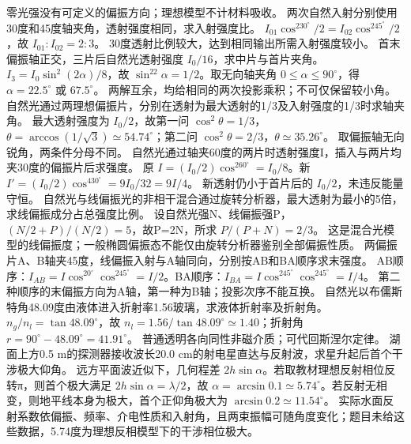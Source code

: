 \crosscheck 零光强没有可定义的偏振方向；理想模型不计材料吸收。
\problemtext 两次自然入射分别使用30度和45度轴夹角，透射强度相同，求入射强度比。
\workings $I_{01}\cos^230^\circ/2=I_{02}\cos^245^\circ/2$，故 $I_{01}:I_{02}=2:3$。
\crosscheck 30度透射比例较大，达到相同输出所需入射强度较小。
\problemtext 首末偏振轴正交，三片后自然光透射强度 $I_0/16$，求中片与首片夹角。
\workings $I_3=I_0\sin^2(2\alpha)/8$，故 $\sin^22\alpha=1/2$。取无向轴夹角 $0\le\alpha\le90^\circ$，得 $\alpha=22.5^\circ$ 或 $67.5^\circ$。
\crosscheck 两解互余，均给相同的两次投影乘积；不可仅保留较小角。
\problemtext 自然光通过两理想偏振片，分别在透射为最大透射的1/3及入射强度的1/3时求轴夹角。
\workings 最大透射强度为 $I_0/2$，故第一问 $\cos^2\theta=1/3$，$\theta=\arccos(1/\sqrt3)\simeq54.74^\circ$；第二问 $\cos^2\theta=2/3$，$\theta\simeq35.26^\circ$。
\crosscheck 取偏振轴无向锐角，两条件分母不同。
\problemtext 自然光通过轴夹60度的两片时透射强度I，插入与两片均夹30度的偏振片后求强度。
\workings 原 $I=(I_0/2)\cos^260^\circ=I_0/8$。新 $I'=(I_0/2)\cos^430^\circ=9I_0/32=9I/4$。
\crosscheck 新透射仍小于首片后的 $I_0/2$，未违反能量守恒。
\problemtext 自然光与线偏振光的非相干混合通过旋转分析器，最大透射为最小的5倍，求线偏振成分占总强度比例。
\workings 设自然光强N、线偏振强P，$(N/2+P)/(N/2)=5$，故P=2N，所求 $P/(P+N)=2/3$。
\crosscheck 这是混合光模型的线偏振度；一般椭圆偏振态不能仅由旋转分析器鉴别全部偏振性质。
\problemtext 两偏振片A、B轴夹45度，线偏振入射与A轴同向，分别按AB和BA顺序求末强度。
\workings AB顺序：$I_{AB}=I\cos^20^\circ\cos^245^\circ=I/2$。BA顺序：$I_{BA}=I\cos^245^\circ\cos^245^\circ=I/4$。
\crosscheck 第二种顺序的末偏振方向为A轴，第一种为B轴；投影次序不能互换。
\problemtext 自然光以布儒斯特角48.09度由液体进入折射率1.56玻璃，求液体折射率及折射角。
\workings $n_g/n_l=\tan48.09^\circ$，故 $n_l=1.56/\tan48.09^\circ\simeq1.40$；折射角 $r=90^\circ-48.09^\circ=41.91^\circ$。
\crosscheck 普通透明各向同性非磁介质；可代回斯涅尔定律。
\problemtext 湖面上方0.5 m的探测器接收波长20.0 cm的射电星直达与反射波，求星升起后首个干涉极大仰角。
\workings 远方平面波近似下，几何程差 $2h\sin\alpha$。若取教材理想反射相位反转π，则首个极大满足 $2h\sin\alpha=\lambda/2$，故 $\alpha=\arcsin0.1\simeq5.74^\circ$。若反射无相变，则地平线本身为极大，首个正仰角极大为 $\arcsin0.2\simeq11.54^\circ$。
\crosscheck 实际水面反射系数依偏振、频率、介电性质和入射角，且两束振幅可随角度变化；题目未给这些数据，5.74度为理想反相模型下的干涉相位极大。
